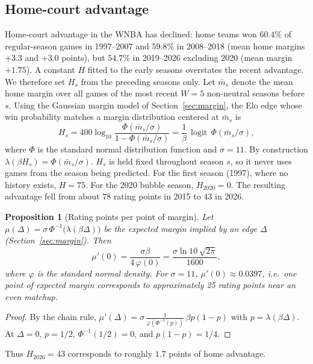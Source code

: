 \documentclass[11pt]{article}
\newcommand{\Hwin}{5}              %
\newcommand{\Hinit}{75}            %
\newcommand{\sigmaval}{11}         %
\newcommand{\logit}{\operatorname{logit}}
\theoremstyle{plain}
\newtheorem{proposition}{Proposition}
\theoremstyle{definition}
\theoremstyle{remark}
\begin{document}
\subsection{Home-court advantage}\label{sec:hca}

Home-court advantage in the WNBA has declined: home teams won $60.4\%$ of regular-season games in 1997--2007 and $59.8\%$ in 2008--2018 (mean home margins $+3.3$ and $+3.0$ points), but $54.7\%$ in 2019--2026 excluding 2020 (mean margin $+1.75$). A constant $H$ fitted to the early seasons overstates the recent advantage. We therefore set $H_s$ from the preceding seasons only. Let $\bar m_s$ denote the mean home margin over all games of the most recent $W = \Hwin$ non-neutral seasons before $s$. Using the Gaussian margin model of Section~\ref{sec:margin}, the Elo edge whose win probability matches a margin distribution centered at $\bar m_s$ is
\begin{equation}\label{eq:hca}
  H_s = 400\log_{10}\frac{\Phi(\bar m_s/\sigma)}{1 - \Phi(\bar m_s/\sigma)} = \frac{1}{\beta}\,\logit\,\Phi(\bar m_s/\sigma),
\end{equation}
where $\Phi$ is the standard normal distribution function and $\sigma = \sigmaval$. By construction $\lambda(\beta H_s) = \Phi(\bar m_s/\sigma)$. $H_s$ is held fixed throughout season $s$, so it never uses games from the season being predicted. For the first season (1997), where no history exists, $H = \Hinit$. For the 2020 bubble season, $H_{2020} = 0$. The resulting advantage fell from about 78 rating points in 2015 to 43 in 2026.

\begin{proposition}[Rating points per point of margin]\label{prop:slope}
Let $\mu(\Delta) = \sigma\,\Phi^{-1}\!\bigl(\lambda(\beta\Delta)\bigr)$ be the expected margin implied by an edge $\Delta$ (Section~\ref{sec:margin}). Then
\[
  \mu'(0) = \frac{\sigma\beta}{4\,\varphi(0)} = \frac{\sigma \ln 10\,\sqrt{2\pi}}{1600},
\]
where $\varphi$ is the standard normal density. For $\sigma = \sigmaval$, $\mu'(0) \approx 0.0397$, i.e.\ one point of expected margin corresponds to approximately 25 rating points near an even matchup.
\end{proposition}
\begin{proof}
By the chain rule, $\mu'(\Delta) = \sigma\,\frac{1}{\varphi(\Phi^{-1}(p))}\,\beta p(1-p)$ with $p = \lambda(\beta\Delta)$. At $\Delta = 0$, $p = 1/2$, $\Phi^{-1}(1/2) = 0$, and $p(1-p) = 1/4$.
\end{proof}

Thus $H_{2026} = 43$ corresponds to roughly $1.7$ points of home advantage.
\end{document}
